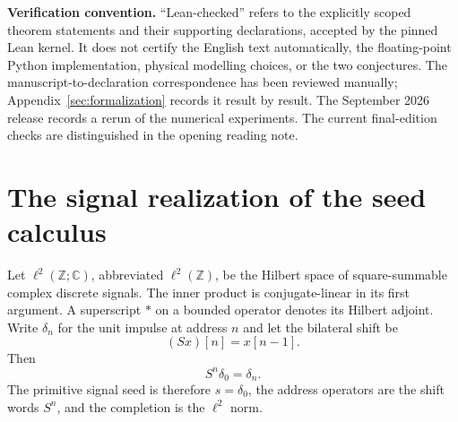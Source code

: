 \documentclass[11pt,a4paper]{article}
\theoremstyle{definition}
\theoremstyle{remark}
\newcommand{\bbC}{\mathbb C}
\newcommand{\bbZ}{\mathbb Z}
\begin{document}
\begin{center}
\end{center}

\clearpage
\noindent\textbf{Verification convention.} ``Lean-checked'' refers to the explicitly scoped theorem statements and their supporting declarations, accepted by the pinned Lean kernel. It does not certify the English text automatically, the floating-point Python implementation, physical modelling choices, or the two conjectures. The manuscript-to-declaration correspondence has been reviewed manually; Appendix~\ref{sec:formalization} records it result by result. The September 2026 release records a rerun of the numerical experiments. The current final-edition checks are distinguished in the opening reading note.



\section{The signal realization of the seed calculus}\label{core:section:01}

Let $\ell^2(\bbZ;\bbC)$, abbreviated $\ell^2(\bbZ)$, be the Hilbert space of square-summable complex discrete signals. The inner product is conjugate-linear in its first argument. A superscript $*$ on a bounded operator denotes its Hilbert adjoint. Write $\delta_n$ for the unit impulse at address $n$ and let the bilateral shift be
\[
(Sx)[n]=x[n-1].
\]
Then
\[
S^n\delta_0=\delta_n.
\]
The primitive signal seed is therefore $s=\delta_0$, the address operators are the shift words $S^n$, and the completion is the $\ell^2$ norm.
\end{document}
